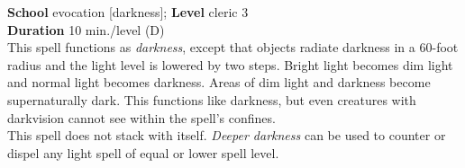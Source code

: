 \textbf{School }evocation [darkness]; \textbf{Level }cleric 3\\
\textbf{Duration }10 min./level (D)\\
This spell functions as \textit{darkness}, except that objects radiate darkness in a 60-foot radius and the light level is lowered by two steps. Bright light becomes dim light and normal light becomes darkness. Areas of dim light and darkness become supernaturally dark. This functions like darkness, but even creatures with darkvision cannot see within the spell's confines. \\
This spell does not stack with itself. \textit{Deeper darkness} can be used to counter or dispel any light spell of equal or lower spell level.\\
